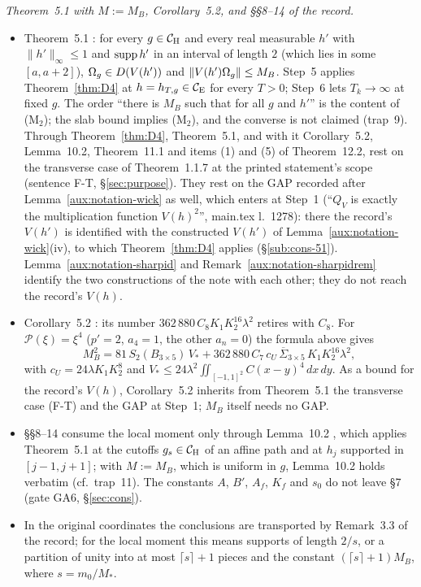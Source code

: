 \emph{Theorem~5.1 with $M:=M_B$, Corollary~5.2, and \S\S8--14 of the record.}
\begin{itemize}
\item Theorem~5.1 \cite[p.~18]{R}: for every $g\in\mathcal{C}_{\mathrm H}$ and every real measurable $h'$ with
$\|h'\|_\infty\le1$ and $\operatorname{supp} h'$ in an interval of length $2$ (which lies in some
$[a,a+2]$), $\Omega_g\in D(V(h'))$ and $\|V(h')\Omega_g\|\le M_B$. Step~5 applies
Theorem~\ref{thm:D4} at $h=h_{T,g}\in\mathcal{C}_{\mathrm E}$ for every $T>0$; Step~6 lets $T_k\to\infty$ at fixed
$g$. The order ``there is $M_B$ such that for all $g$ and $h'$'' is the content of (M$_2$); the
slab bound implies (M$_2$), and the converse is not claimed (trap~9).  Through
Theorem~\ref{thm:D4}, Theorem~5.1, and with it Corollary~5.2, Lemma~10.2, Theorem~11.1 and
items (1) and (5) of Theorem~12.2, rest on the transverse case of Theorem~1.1.7 at the printed
statement's scope (sentence F-T, \S\ref{sec:purpose}).  They rest on the GAP recorded after
Lemma~\ref{aux:notation-wick} as well, which enters at Step~1 (``$Q_V$ is exactly the
multiplication function $V(h)^2$'', main.tex l.~1278): there the record's $V(h')$ is identified
with the constructed $V(h')$ of Lemma~\ref{aux:notation-wick}(iv), to which
Theorem~\ref{thm:D4} applies (\S\ref{sub:cons-51}).  Lemma~\ref{aux:notation-sharpid} and
Remark~\ref{aux:notation-sharpidrem} identify the two constructions of the note with each other;
they do not reach the record's $V(h)$.
\item Corollary~5.2 \cite[p.~19]{R}: its number $362\,880\,C_8K_1K_2^{16}\lambda^2$ retires
with $C_8$. For $\mathscr P(\xi)=\xi^4$ ($p'=2$, $a_4=1$, the other $a_n=0$) the formula above
gives
\[
 M_B^2=81\,S_2(B_{3\times5})\,V_*+362\,880\,C_7\,c_U\,\overline\Sigma_{3\times5}\,
 K_1K_2^{16}\lambda^2,
\]
with $c_U=24\lambda K_1K_2^8$ and $V_*\le24\lambda^2\iint_{[-1,1]^2}C(x-y)^4\,dx\,dy$.  As a
bound for the record's $V(h)$, Corollary~5.2 inherits from Theorem~5.1 the transverse case (F-T)
and the GAP at Step~1; $M_B$ itself needs no GAP.
\item \S\S8--14 consume the local moment only through Lemma~10.2 \cite[p.~28]{R}, which applies
Theorem~5.1 at the cutoffs $g_s\in\mathcal{C}_{\mathrm H}$ of an affine path and at $h_j$ supported in
$[j-1,j+1]$; with $M:=M_B$, which is uniform in $g$, Lemma~10.2 holds verbatim (cf.\ trap~11).
The constants $A$, $B'$, $A_f$, $K_f$ and $s_0$ do not leave \S7 (gate GA6,
\S\ref{sec:cons}).
\item In the original coordinates the conclusions are transported by Remark~3.3 of the
record; for the local moment this means supports of length $2/s$, or a partition of unity into
at most $\lceil s\rceil+1$ pieces and the constant $(\lceil s\rceil+1)M_B$, where
$s=m_0/M_*$.
\end{itemize}

